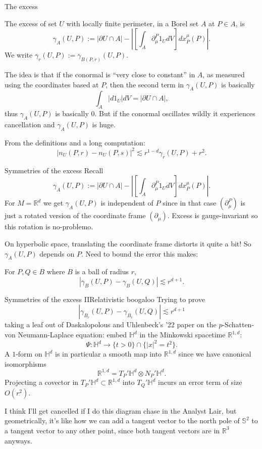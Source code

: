 \documentclass[10pt]{beamer}
\newcommand{\RR}{\mathbb{R}}
\begin{document}
\begin{frame}{The excess}
\begin{definition}
The excess of set $U$ with locally finite perimeter, in a Borel set $A$ at $P \in A$, is 
$$\gamma_A(U, P) := |\partial U \cap A| - \left|\left[\int_A \partial^P_\mu 1_U dV\right] dx_P^\mu(P)\right|.$$
We write $\gamma_r(U, P) := \gamma_{B(P, r)}(U, P)$.
\end{definition}\pause

The idea is that if the conormal is ``very close to constant'' in $A$, as measured using the coordinates based at $P$, then the second term in $\gamma_A(U, P)$ is basically
$$\int_A |d1_U|dV = |\partial U \cap A|,$$
thus $\gamma_A(U, P)$ is basically $0$. But if the conormal oscillates wildly it experiences cancellation and $\gamma_A(U, P)$ is huge.\pause

From the definitions and a long computation:
$$|n_U(P, r) - n_U(P, s)|^2 \lesssim r^{1 - d} \gamma_r(U, P) + r^2.$$
\end{frame}

\begin{frame}{Symmetries of the excess}
Recall 
$$\gamma_A(U, P) := |\partial U \cap A| - \left|\left[\int_A \partial^P_\mu 1_U dV\right] dx_P^\mu(P)\right|.$$
For $M = \RR^d$ we get $\gamma_A(U, P)$ is independent of $P$ since in that case $(\partial^P_\mu)$ is just a rotated version of the coordinate frame $(\partial_\mu)$.
Excess is gauge-invariant so this rotation is no-problemo.\pause

On hyperbolic space, translating the coordinate frame distorts it quite a bit! So $\gamma_A(U, P)$ depends on $P$.
Need to bound the error this makes:

\begin{lemma}
For $P, Q \in B$ where $B$ is a ball of radius $r$,
$$|\gamma_B(U, P) - \gamma_B(U, Q)| \lesssim r^{d + 1}.$$
\end{lemma}
\end{frame}

\begin{frame}{Symmetries of the excess II}{Relativistic boogaloo}
    Trying to prove 
    $$|\gamma_{B_r}(U, P) - \gamma_{B_r}(U, Q)| \lesssim r^{d + 1}$$
    taking a leaf out of Daskalopolous and Uhlenbeck's '22 paper on the $p$-Schatten-von Neumann-Laplace equation: embed $\mathbb H^d$ in the Minkowski spacetime $\RR^{1, d}$:
    $$\Psi: \mathbb H^d \to \{t > 0\} \cap \{|x|^2 = t^2\}.$$\pause
    A $1$-form on $\mathbb H^d$ is in particular a smooth map into $\RR^{1, d}$ since we have canonical isomorphisms
    $$\RR^{1, d} = T_P' \mathbb H^d \otimes N_P' \mathbb H^d.$$\pause
    Projecting a covector in $T_P' \mathbb H^d \subset \RR^{1, d}$ into $T_Q' \mathbb H^d$ incurs an error term of size $O(r^2)$.
\pause

I think I'll get cancelled if I do this diagram chase in the Analyst Lair, but geometrically, it's like how we can add a tangent vector to the north pole of $\mathbb S^2$ to a tangent vector to any other point, since both tangent vectors are in $\RR^3$ anyways.
\end{frame}
\end{document}

